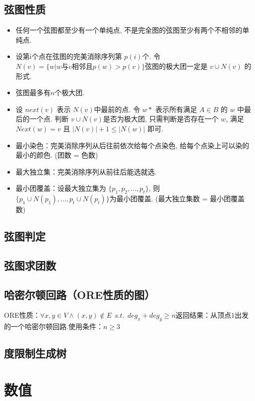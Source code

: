 \documentclass[landscape,a4paper]{article}
\begin{document}
\begin{spacing}{0.3}
\begin{multicols}{3}
	\subsection{弦图性质}
\begin{itemize}
\item 任何一个弦图都至少有一个单纯点, 不是完全图的弦图至少有两个不相邻的单纯点.
\item 设第i个点在弦图的完美消除序列第 $p(i)$个. 令 $N(v) = \{w | w \text{与} v \text{相邻且} p(w) > p(v) \}$弦图的极大团一定是 $v \cup N(v)$ 的形式.
\item 弦图最多有$n$个极大团.
\item 设 $next(v)$ 表示 $N(v)$中最前的点. 令 $w*$ 表示所有满足 $A\in B$ 的 $w$ 中最后的一个点.
  判断 $v \cup N(v)$是否为极大团,
  只需判断是否存在一个 $w$,
  满足 $Next(w) = v$ 且 $|N(v)| + 1 \le |N(w)|$ 即可.
\item 最小染色：完美消除序列从后往前依次给每个点染色, 给每个点染上可以染的最小的颜色. (团数 = 色数)
\item 最大独立集：完美消除序列从前往后能选就选.
\item 最小团覆盖：设最大独立集为 $\{p_1, p_2, \ldots, p_t\}$, 则 $\{p_1 \cup N(p_1), \ldots, p_t \cup N(p_t) \}$为最小团覆盖.  (最大独立集数 = 最小团覆盖数)
\end{itemize}
\subsection{弦图判定}

\subsection{弦图求团数}

\subsection{哈密尔顿回路（ORE性质的图）}
ORE性质：$\forall x,y \in V \wedge (x,y) \notin E \ \ s.t. \ \ deg_x+deg_y \geq n$返回结果：从顶点$1$出发的一个哈密尔顿回路.使用条件：$n \geq 3$

\subsection{度限制生成树}



	\section{数值}

\end{multicols}
\end{spacing}
\end{document}
